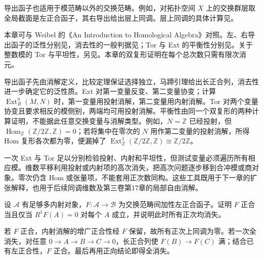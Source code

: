 \ProseParagraphBreak
导出函子也适用于模范畴以外的交换范畴。例如，对拓扑空间 \(X\) 上的交换群层取全局截面是左正合函子，其右导出给出层上同调。层上同调的具体计算见。

\ProseParagraphBreak
本章可与 Weibel 的《An Introduction to Homological Algebra》\cite[Section 2.1, Definition 2.1.4; Sections 2.4--2.7]{Weibel1994HomologicalAlgebra}对照。左、右导出函子的泛性分别见\cite[Theorem 2.4.7; Section 2.5.1]{Weibel1994HomologicalAlgebra}，消去性的一般判据见\cite[Exercise 2.4.5]{Weibel1994HomologicalAlgebra}；Tor 与 Ext 的平衡性分别见\cite[Theorem 2.7.2, Theorem 2.7.6]{Weibel1994HomologicalAlgebra}。关于整数模的 Tor 与平坦性，另见\cite[Sections 3.1--3.2]{Weibel1994HomologicalAlgebra}。本章的双复形证明在每个总次数只需有限次消元。







\begin{chaptersummary}
	导出函子先由消解定义，比较定理保证选择独立，马蹄引理给出长正合列，消去性进一步确定它的泛性质。Ext 对第一变量反变、第二变量协变；计算 \(\operatorname{Ext}_R^n(M,N)\) 时，第一变量用投射消解，第二变量用内射消解。Tor 对两个变量协变且要求相反的模侧别，两端均可用投射消解。平衡性由同一个双复形的两种计算证明，不能据此任意交换变量与消解类型。例如，\(N=\mathbb Z\) 已经投射，但 \(\operatorname{Hom}_{\mathbb Z}(\mathbb Z/2\mathbb Z,\mathbb Z)=0\)；若将集中在零次的 \(N\) 用作第二变量的投射消解，所得 Hom 复形各次都为零，便漏掉了 \(\operatorname{Ext}_{\mathbb Z}^1(\mathbb Z/2\mathbb Z,\mathbb Z)\cong\mathbb Z/2\mathbb Z\)。

	\ProseParagraphBreak
	一次 Ext 与 Tor 足以分别检验投射、内射和平坦性，但测试变量必须遍历所有相应模。维数平移利用投射或内射项的高次消失，把高次问题逐步移到合冲模或商对象。零次仍含 Hom 或张量项，不能套用正次数同构。这些工具既用于下一章的扩张解释，也用于后续同调维数及第三卷第17章的局部自由消解。
\end{chaptersummary}

\BookExercises

\begin{exercise}\label{b4:ex:08-derived-exactness}
	设 \(\mathcal A\) 有足够多内射对象，\(F:\mathcal A\to\mathcal B\) 为交换范畴间加性左正合函子。证明 \(F\) 正合当且仅当 \(R^1F(A)=0\) 对每个 \(A\) 成立，并说明此时所有正次均消失。
\end{exercise}
\begin{solution}
	若 \(F\) 正合，内射消解的增广正合性经 \(F\) 保留，故所有正次上同调为零。若一次全消失，对任意 \(0\to A\to B\to C\to0\)，长正合列使 \(F(B)\to F(C)\) 满；结合已有左正合性，\(F\) 正合。最后再用正向结论即得全消失。
\end{solution}

